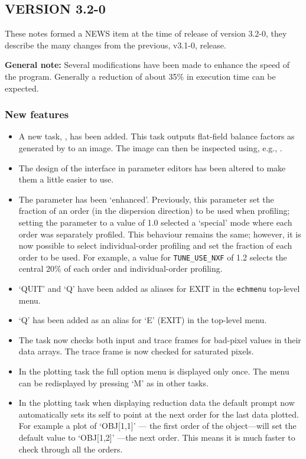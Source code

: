 \subsection{VERSION 3.2-0}

These notes formed a NEWS item at the time of release of version 3.2-0, they
describe the many changes from the previous, v3.1-0, release.

{\bf General note:}
 Several modifications have been made to enhance the speed of the
 program.  Generally a reduction of about 35\% in execution time can
 be expected.

\subsubsection{New features}

\begin{itemize}
 \item A new task, ,
   has been added.  This task outputs flat-field
   balance factors as generated by 
   to an image.  The image
   can then be inspected using, e.g., 
   .
\item The design of the interface in parameter editors has been altered
   to make them a little easier to use.
\item The parameter 
   has been `enhanced'.  Previously, this
   parameter set the fraction of an order (in the dispersion direction)
   to be used when profiling; setting the parameter to a value of 1.0
   selected a `special' mode where each order was separately profiled.
   This behaviour remains the same; however, it is now possible to
   select individual-order profiling and set the fraction of each order
   to be used.  For example, a value for {\tt TUNE\_USE\_NXF} of 1.2 selects
   the central 20\% of each order and individual-order profiling.
\item `QUIT' and `Q' have been added as aliases for EXIT in the \verb+echmenu+
   top-level menu.
\item `Q' has been added as an alias for `E' (EXIT) in the
    top-level menu.
\item The task  now checks both
   input and trace frames for
   bad-pixel values in their data arrays.  The trace frame is now
   checked for saturated pixels.
\item In the plotting task the full option menu is displayed only once.
   The menu can be redisplayed by pressing `M' as in other tasks.
\item In the plotting task when displaying reduction data the default
   prompt now automatically sets its self to point at the next order
   for the last data plotted.  For example a plot of `OBJ[1,1]' --- the
   first order of the object---will set the default value to `OBJ[1,2]'
   ---the next order.  This means it is much faster to check through all
   the orders.
\end{itemize}

